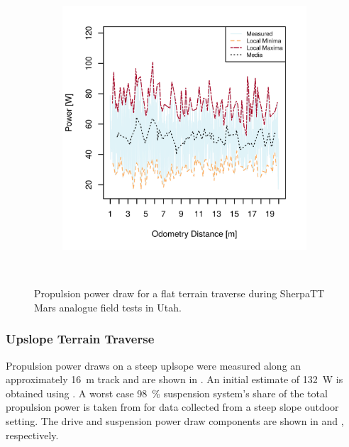 \begin{figure}[h]
\begin{subfigure}[t]{\subfigureWidth}
        \includegraphics[height=\graphicsHeight]{sections/power-system-design/power-budget/plots/locomotion-power-draw-on-flat-terrain-2.png}
		\label{fig:plot:sub:sherpatt-flat-terrain-power-draw-2}
	\end{subfigure}\\[0.8ex]
    \caption[Propulsion power draw for a flat terrain traverse]
            {Propulsion power draw for a flat terrain traverse during SherpaTT Mars analogue field tests in Utah.}
    \label{fig:plot:sherpatt-flat-terrain-power-draw}
\vspace{-2ex}
\end{figure}


\subsubsection{Upslope Terrain Traverse}
\label{sec:PowerBudget:PropulsionPowerBudget:UpslopeTerrainTraverse}
Propulsion power draws on a steep uplsope were measured along an approximately \SI{16}{\meter} track and are shown in . An initial estimate of \SI{132}{\watt} is obtained using . A worst case \SI{98}{\percent} suspension system's share of the total propulsion power is taken from  for data collected from a steep slope outdoor setting. The drive and suspension power draw components are shown in  and , respectively.


